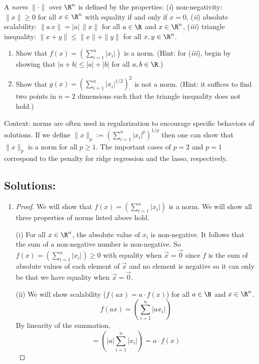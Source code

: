 \documentclass[shortlabels]{article}
\begin{document}
\begin{aprob}
    A \emph{norm} $\|\cdot\|$ over $\R^n$ is defined by the properties:
    (\textit{i}) non-negativity: $\|x\|\geq 0$ for all $x \in \R^n$ with equality if and only if $x=0$,
    (\textit{ii}) absolute scalability: $\|a \, x\| = |a| \, \|x\|$ for all $a \in \R$ and $x \in \R^n$,
    (\textit{iii}) triangle inequality: $\|x+y\| \leq \|x\| + \|y\|$ for all $x,y \in \R^n$.
    \begin{enumerate}
      \item {} Show that $f(x) = \left( \sum_{i=1}^n |x_i| \right)$ is a norm. (Hint: for (\textit{iii}), begin by showing that $|a+b|\leq |a| + |b|$ for all $a,b \in \R$.)
      \item {} Show that $g(x) = \left(\sum_{i=1}^n |x_i|^{1/2}\right)^2$ is not a norm. (Hint: it suffices to find two points in $n=2$ dimensions such that the triangle inequality does not hold.)
    \end{enumerate}
    Context: norms are often used in regularization to encourage specific behaviors of solutions. If we define  $\| x \|_p := \left( \sum_{i=1}^n |x_i|^{p} \right)^{1/p}$ then one can show that $\| x \|_p$ is a norm for all $p \geq 1$. The important cases of $p=2$ and $p=1$ correspond to the penalty for ridge regression and the lasso, respectively. \\

    \subsection*{Solutions:}
    \begin{enumerate}
        \item
        \begin{proof}
            We will show that $f(x) = \left( \sum_{i=1}^n |x_i| \right)$ is a norm. We will show all three properties of norms listed above hold.

            (i) For all $x \in \R^n$, the absolute value of $x_i$ is non-negative. It follows that the sum of a non-negative number is non-negative. So $f(x) = \left( \sum_{i=1}^n |x_i| \right) \geq 0$ with equality when $\vec{x} = \vec{0}$ since $f$ is the sum of absolute values of each element of $\vec{x}$ and no element is negative so it can only be that we have equality when $\vec{x} = \vec{0}$.

            (ii) We will show scalability ($f(ax) = a \cdot f(x)$) for all $a \in \R$ and $x \in \R^n$.
            \[ f(ax) = \left( \sum_{i=1}^n |a x_i| \right) \] 
            By linearity of the summation,
            \[ =  \left( |a| \sum_{i=1}^n |x_i| \right) = a \cdot f(x) \]


\end{proof}
\end{enumerate}
\end{aprob}
\end{document}
